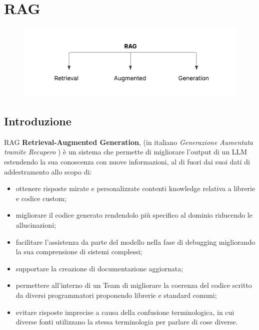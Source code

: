 \documentclass[12pt,a4paper,openright,twoside]{book}
\begin{document}
\chapter{RAG}
\begin{figure}[h]
    \raggedright
    \includegraphics[width=0.8\linewidth]{figures/RAGDefinizione.png}
    \label{fig:significa-RAG}
\end{figure}
\section{Introduzione}
RAG \textbf{Retrieval-Augmented Generation}, (in italiano \textit{Generazione Aumentata tramite Recupero} )  è un sistema che permette di migliorare l'output di un LLM estendendo la sua conoscenza con nuove informazioni, al di fuori dai suoi dati di addestramento allo scopo di:
\begin{itemize}
    \item ottenere risposte mirate e personalizzate contenti knowledge relativa a librerie e codice custom;
    \item migliorare il codice generato rendendolo più specifico al dominio riducendo le allucinazioni;
    \item facilitare l'assistenza da parte del modello nella fase di debugging migliorando la sua comprensione di sistemi complessi;
    \item supportare la creazione di documentazione aggiornata;
    \item permettere all'interno di un Team di migliorare la coerenza del codice scritto da diversi programmatori proponendo librerie e standard comuni;
    \item evitare risposte imprecise a causa della confusione terminologica, in cui diverse fonti utilizzano la stessa terminologia per parlare di cose diverse.
\end{itemize}
\newpage
\end{document}
